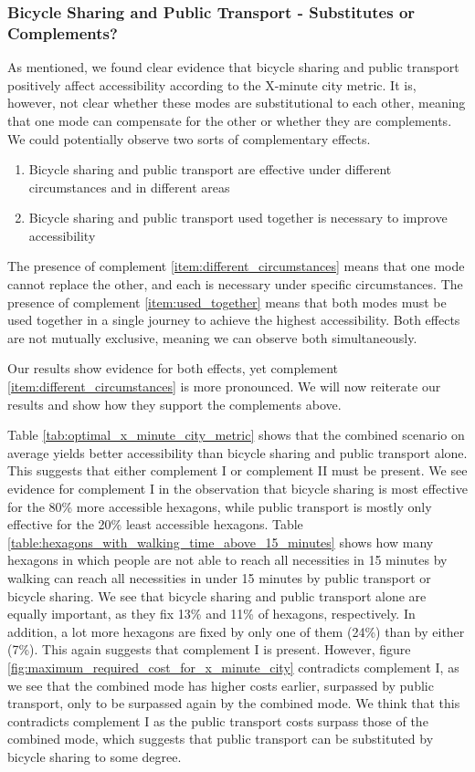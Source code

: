 \subsubsection{Bicycle Sharing and Public Transport - Substitutes or Complements?}
As mentioned, we found clear evidence that bicycle sharing and public transport positively affect accessibility according to the X-minute city metric.
It is, however, not clear whether these modes are substitutional to each other, meaning that one mode can compensate for the other or whether they are complements.
We could potentially observe two sorts of complementary effects.
\begin{enumerate}
  \renewcommand{\labelenumi}{Complement \theenumi.}
  \item Bicycle sharing and public transport are effective under different circumstances and in different areas \label{item:different_circumstances}
  \item Bicycle sharing and public transport used together is necessary to improve accessibility \label{item:used_together}
\end{enumerate}
The presence of complement \ref{item:different_circumstances} means that one mode cannot replace the other, and each is necessary under specific circumstances.
The presence of complement \ref{item:used_together} means that both modes must be used together in a single journey to achieve the highest accessibility.
Both effects are not mutually exclusive, meaning we can observe both simultaneously.

Our results show evidence for both effects, yet complement \ref{item:different_circumstances} is more pronounced.
We will now reiterate our results and show how they support the complements above.

Table \ref{tab:optimal_x_minute_city_metric} shows that the combined scenario on average yields better accessibility than bicycle sharing and public transport alone.
This suggests that either complement I or complement II must be present.
We see evidence for complement I in the observation that bicycle sharing is most effective for the 80\% more accessible hexagons, while public transport is mostly only effective for the 20\% least accessible hexagons.
Table \ref{table:hexagons_with_walking_time_above_15_minutes} shows how many hexagons in which people are not able to reach all necessities in 15 minutes by walking can reach all necessities in under 15 minutes by public transport or bicycle sharing.
We see that bicycle sharing and public transport alone are equally important, as they fix 13\% and 11\% of hexagons, respectively.
In addition, a lot more hexagons are fixed by only one of them (24\%) than by either (7\%).
This again suggests that complement I is present.
However, figure \ref{fig:maximum_required_cost_for_x_minute_city} contradicts complement I, as we see that the combined mode has higher costs earlier, surpassed by public transport, only to be surpassed again by the combined mode.
We think that this contradicts complement I as the public transport costs surpass those of the combined mode, which suggests that public transport can be substituted by bicycle sharing to some degree.


